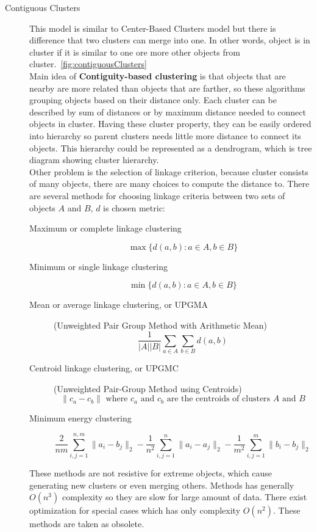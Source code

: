 \begin{description}
\item[Contiguous Clusters] This model is similar to Center-Based Clusters model but there is difference that two clusters can merge into one. In other words, object is in cluster if it is similar to one ore more other objects from cluster.~\autoref{fig:contiguousClusters}\\
Main idea of \textbf{Contiguity-based clustering} is that objects that are nearby are more related than objects that are farther, so these algorithms grouping objects based on their distance only. Each cluster can be described by sum of distances or by maximum distance needed to connect objects in cluster. Having these cluster property, they can be easily ordered into hierarchy so parent clusters needs little more distance to connect its objects. This hierarchy could be represented as a dendrogram, which is tree diagram showing cluster hierarchy.\\

Other problem is the selection of linkage criterion, because cluster consists of many objects, there are many choices to compute the distance to. There are several methods for choosing linkage criteria between two sets of objects $A$ and $B$, $d$ is chosen metric:
\begin{description}
\item[Maximum or complete linkage clustering] $$\max\{d(a,b) : a \in A, b \in B\}$$
\item[Minimum or single linkage clustering] $$\min\{d(a,b) : a \in A, b \in B\}$$
\item[Mean or average linkage clustering, or UPGMA] (Unweighted Pair Group Method with Arithmetic Mean) $$\frac{1}{|A||B|}\sum_{a \in A} \sum_{b \in B} d(a,b)$$
\item[Centroid linkage clustering, or UPGMC] (Unweighted Pair-Group Method using Centroids) $$\|c_a - c_b\| \mbox{ where } c_a \mbox{ and } c_b \mbox{ are the centroids of clusters } A \mbox{ and } B$$
\item[Minimum energy clustering] $$\frac{2}{nm}\sum_{i,j=1}^{n,m}\|a_i-b_j\|_2-\frac{1}{n^2}\sum_{i,j=1}^{n}\|a_i-a_j\|_2-\frac{1}{m^2}\sum_{i,j=1}^{m}\|b_{i}-b_{j}\|_{2}$$
\end{description}

These methods are not resistive for extreme objects, which cause generating new clusters or even merging others. Methods has generally $O(n^3)$ complexity so they are slow for large amount of data. There exist optimization for special cases which has only complexity $O(n^2)$. These methods are taken as obsolete.


\end{description}
